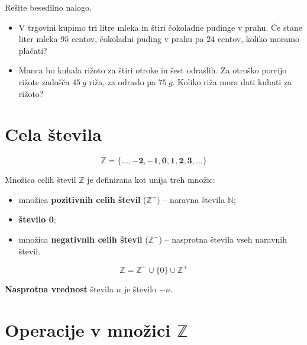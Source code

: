  
     \begin{naloga}
        Rešite besedilno nalogo.
        \begin{itemize}
            \item V trgovini kupimo tri litre mleka in štiri čokoladne pudinge v prahu. Če stane liter mleka $95$ centov,
                čokoladni puding v prahu pa $24$ centov, koliko moramo plačati? 
            \item Manca bo kuhala rižoto za štiri otroke in šest odraslih. Za otroško porcijo rižote zadošča $45~g$ riža,
                za odraslo pa $75~g$. Koliko riža mora dati kuhati za rižoto? 
        \end{itemize}
     \end{naloga}
 


\newpage
   \section{Cela števila}
         
                    $$\mathbf{\mathbb{Z} = \{\ldots, -2, -1, 0, 1, 2, 3, \ldots\}}$$
                

                 
                    Množica celih števil $\mathbb{Z}$ je definirana kot unija treh množic:
                        \begin{itemize}
                            \item množica \textbf{pozitivnih celih števil} ($\mathbb{Z}^+$) -- naravna števila $\mathbb{N}$;
                            \item \textbf{število 0};
                            \item množica \textbf{negativnih celih števil} ($\mathbb{Z}^-$) -- nasprotna števila vseh naravnih števil.
                        \end{itemize}
                      $$\mathbb{Z} = \mathbb{Z}^- \cup \{0\} \cup \mathbb{Z}^+$$

                 

                 
                    \textbf{Nasprotna vrednost} števila $n$ je število $-n$.
                 
         

         
             \section{Operacije v množici $\mathbb{Z}$}

